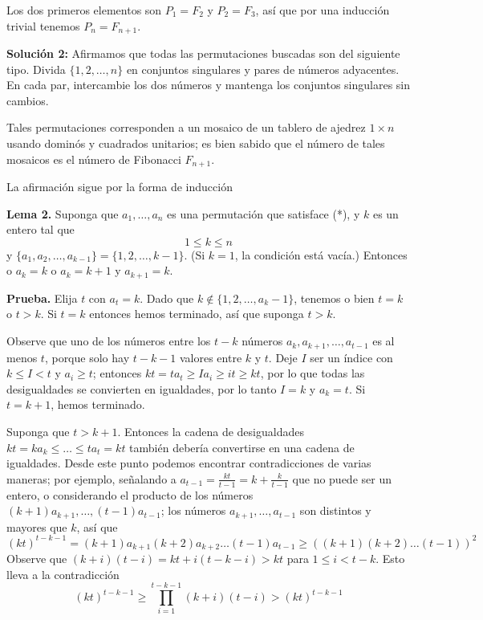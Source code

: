 \documentclass{article}
\begin{document}
Los dos primeros elementos son \( P_1 = F_2 \) y \( P_2 = F_3 \), así que por una inducción trivial tenemos \( P_n = F_{n+1} \).

\textbf{Solución 2:} Afirmamos que todas las permutaciones buscadas son del siguiente tipo. Divida \( \{1, 2, \ldots, n\} \) en conjuntos singulares y pares de números adyacentes. En cada par, intercambie los dos números y mantenga los conjuntos singulares sin cambios.

Tales permutaciones corresponden a un mosaico de un tablero de ajedrez \( 1 \times n \) usando dominós y cuadrados unitarios; es bien sabido que el número de tales mosaicos es el número de Fibonacci \( F_{n+1} \).

La afirmación sigue por la forma de inducción

\textbf{Lema 2.} Suponga que \( a_1 , \ldots, a_n \) es una permutación que satisface (*), y \( k \) es un entero tal que
\[ 1 \leq k \leq n \] y \( \{a_1, a_2, \ldots, a_{k-1}\} = \{1, 2, \ldots, k - 1\} \). (Si \( k = 1 \), la condición está vacía.) Entonces o \( a_k = k \) o \( a_k = k + 1 \) y \( a_{k+1} = k \).

\textbf{Prueba.} Elija \( t \) con \( a_t = k \). Dado que \( k \notin \{1,2, \ldots, a_k-1\} \), tenemos o bien \( t = k \) o \( t > k \). Si \( t = k \) entonces hemos terminado, así que suponga \( t > k \).

Observe que uno de los números entre los \( t - k \) números \( a_k , a_{k+1} , \ldots , a_{t-1} \) es al menos \( t \), porque solo hay \( t - k - 1 \) valores entre \( k \) y \( t \). Deje \( I \) ser un índice con \( k \leq I < t \) y \( a_i \geq t \); entonces \( kt = t a_t \geq I a_i \geq it \geq kt \), por lo que todas las desigualdades se convierten en igualdades, por lo tanto \( I = k \) y \( a_k = t \). Si \( t = k + 1 \), hemos terminado.

Suponga que \( t > k + 1 \). Entonces la cadena de desigualdades \( kt = k a_k \leq \ldots \leq t a_t = kt \) también debería convertirse en una cadena de igualdades. Desde este punto podemos encontrar contradicciones de varias maneras; por ejemplo, señalando a \( a_{t-1} = \frac{kt}{t-1} = k + \frac{k}{t-1} \) que no puede ser un entero, o considerando el producto de los números \( (k+1) a_{k+1}, \ldots, (t-1) a_{t-1} \); los números \( a_{k+1} , \ldots, a_{t-1} \) son distintos y mayores que \( k \), así que
\[ (kt)^{t-k-1} = (k+1) a_{k+1} (k+2) a_{k+2} \ldots (t-1) a_{t-1} \geq ((k+1)(k+2) \ldots (t-1))^2 \]
Observe que \( (k+i)(t-i) = kt + i (t-k-i) > kt \) para \( 1 \leq i < t - k \). Esto lleva a la contradicción
\[ (kt)^{t-k-1} \geq \prod_{i=1}^{t-k-1} (k+i)(t-i) > (kt)^{t-k-1} \]
\end{document}
